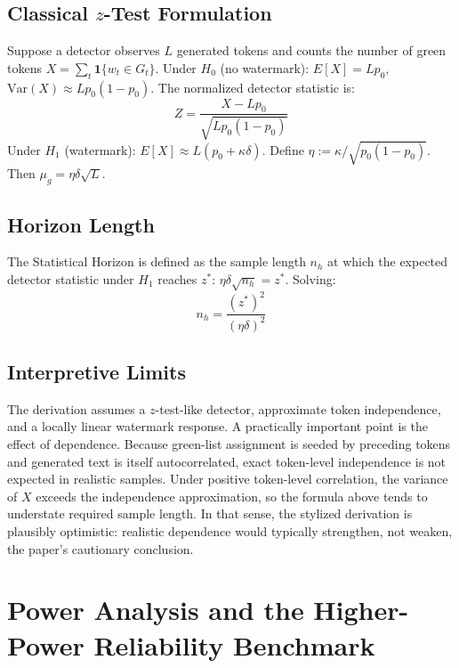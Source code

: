 \documentclass[11pt]{article}
\begin{document}
\subsection{Classical $z$-Test Formulation}

Suppose a detector observes $L$ generated tokens and counts the number of green
tokens $X = \sum_t \mathbf{1}\{w_t \in G_t\}$. Under $H_0$ (no watermark):
$E[X] = Lp_0$, $\mathrm{Var}(X) \approx Lp_0(1-p_0)$. The normalized detector
statistic is:
\begin{equation}
Z = \frac{X - Lp_0}{\sqrt{Lp_0(1-p_0)}}
\end{equation}
Under $H_1$ (watermark): $E[X] \approx L(p_0 + \kappa\delta)$. Define $\eta :=
\kappa/\sqrt{p_0(1-p_0)}$. Then $\mu_g = \eta\delta\sqrt{L}$.

\subsection{Horizon Length}

The Statistical Horizon is defined as the sample length $n_h$ at which the expected
detector statistic under $H_1$ reaches $z^*$: $\eta\delta\sqrt{n_h} = z^*$. Solving:
\begin{equation}
n_h = \frac{(z^*)^2}{(\eta\delta)^2}
\end{equation}

\subsection{Interpretive Limits}

The derivation assumes a $z$-test-like detector, approximate token independence, and
a locally linear watermark response. A practically important point is the effect of
dependence. Because green-list assignment is seeded by preceding tokens and generated
text is itself autocorrelated, exact token-level independence is not expected in
realistic samples. Under positive token-level correlation, the variance of $X$
exceeds the independence approximation, so the formula above tends to understate
required sample length. In that sense, the stylized derivation is plausibly
optimistic: realistic dependence would typically strengthen, not weaken, the paper's
cautionary conclusion.

\section{Power Analysis and the Higher-Power Reliability Benchmark}
\end{document}
